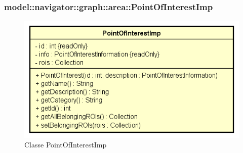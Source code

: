 \documentclass[../DefinizioneDiProdotto.tex]{subfiles}
\begin{document}
\subsubsection{model::navigator::graph::area::PointOfInterestImp}

    \begin{figure}[H]
        \centering
        \includegraphics{img/PointOfInterestImp.png}
        \caption{Classe PointOfInterestImp}\label{fig:model::navigator::graph::area::PointOfInterestImp} 
    \end{figure}
\end{document}
